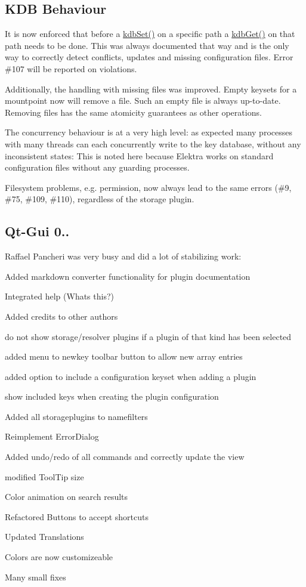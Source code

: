 \subsection*{K\+D\+B Behaviour}

It is now enforced that before a \hyperlink{group__kdb_ga11436b058408f83d303ca5e996832bcf}{kdb\+Set()} on a specific path a \hyperlink{group__kdb_ga28e385fd9cb7ccfe0b2f1ed2f62453a1}{kdb\+Get()} on that path needs to be done. This was always documented that way and is the only way to correctly detect conflicts, updates and missing configuration files. Error \#107 will be reported on violations.

Additionally, the handling with missing files was improved. Empty keysets for a mountpoint now will remove a file. Such an empty file is always up-\/to-\/date. Removing files has the same atomicity guarantees as other operations.

The concurrency behaviour is at a very high level\+: as expected many processes with many threads can each concurrently write to the key database, without any inconsistent states\+: This is noted here because Elektra works on standard configuration files without any guarding processes.

Filesystem problems, e.\+g. permission, now always lead to the same errors (\#9, \#75, \#109, \#110), regardless of the storage plugin.

\subsection*{Qt-\/\+Gui 0..}

Raffael Pancheri was very busy and did a lot of stabilizing work\+:


\begin{DoxyItemize}
\item Added markdown converter functionality for plugin documentation
\item Integrated help (Whats this?)
\item Added credits to other authors
\item do not show storage/resolver plugins if a plugin of that kind has been selected
\item added menu to newkey toolbar button to allow new array entries
\item added option to include a configuration keyset when adding a plugin
\item show included keys when creating the plugin configuration
\item Added all storageplugins to namefilters
\item Reimplement Error\+Dialog
\item Added undo/redo of all commands and correctly update the view
\item modified Tool\+Tip size
\item Color animation on search results
\item Refactored Buttons to accept shortcuts
\item Updated Translations
\item Colors are now customizeable
\item Many small fixes
\end{DoxyItemize}


